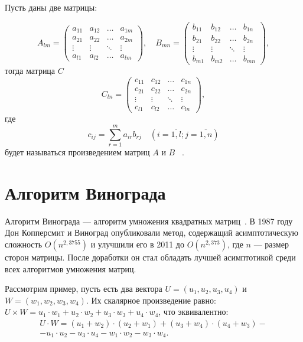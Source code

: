 Пусть даны две матрицы:

\begin{equation}
	A_{lm} = \begin{pmatrix}
		a_{11} & a_{12} & \ldots & a_{1m}\\
		a_{21} & a_{22} & \ldots & a_{2m}\\
		\vdots & \vdots & \ddots & \vdots\\
		a_{l1} & a_{l2} & \ldots & a_{lm}
	\end{pmatrix},
	\quad
	B_{mn} = \begin{pmatrix}
		b_{11} & b_{12} & \ldots & b_{1n}\\
		b_{21} & b_{22} & \ldots & b_{2n}\\
		\vdots & \vdots & \ddots & \vdots\\
		b_{m1} & b_{m2} & \ldots & b_{mn}
	\end{pmatrix},
\end{equation}
тогда матрица $C$
\begin{equation}
	C_{ln} = \begin{pmatrix}
		c_{11} & c_{12} & \ldots & c_{1n}\\
		c_{21} & c_{22} & \ldots & c_{2n}\\
		\vdots & \vdots & \ddots & \vdots\\
		c_{l1} & c_{l2} & \ldots & c_{ln}
	\end{pmatrix},
\end{equation}
где
\begin{equation}
	\label{eq:M}
	c_{ij} =
	\sum_{r=1}^{m} a_{ir}b_{rj} \quad (i=\overline{1,l}; j=\overline{1,n})
\end{equation}
будет называться произведением матриц $A$ и $B$ ~\cite{book_matrix}.

\section{Алгоритм Винограда}

Алгоритм Винограда --- алгоритм умножения квадратных матриц~\cite{book_vinograd}.
В 1987 году Дон Копперсмит и Виноград опубликовали метод, содержащий асимптотическую сложность $O(n^{2,3755})$ и улучшили его в 2011 до $O(n^{2,373})$, где $n$ --- размер сторон матрицы.
После доработки он стал обладать лучшей асимптотикой среди всех алгоритмов умножения матриц.

Рассмотрим пример, пусть есть два вектора $U = (u_1, u_2, u_3, u_4)$ и $W = (w_1, w_2, w_3, w_4)$.
Их скалярное произведение равно: $U \times W = u_1\cdot w_1 + u_2\cdot w_2 + u_3\cdot w_3 + u_4\cdot w_4$, что
эквивалентно:
\begin{equation}
	\label{equ:example_scal_mul}
	\begin{gathered}
		U \cdot W = (u_1 + w_2)\cdot (u_2 + w_1) + (u_3 + w_4)\cdot(u_4 + w_3) -\\
		- u_1\cdot u_2 - u_3\cdot u_4 - w_1\cdot w_2 - w_3\cdot w_4.
	\end{gathered}
\end{equation}

